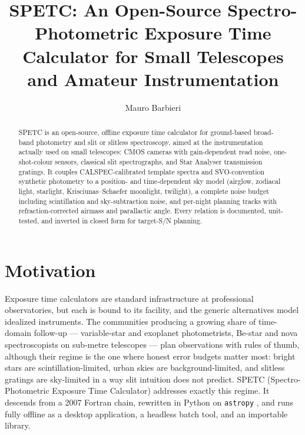 \documentclass[RNAAS]{aastex631}
\begin{document}
\title{SPETC: An Open-Source Spectro-Photometric Exposure Time Calculator
for Small Telescopes and Amateur Instrumentation}

\author[0000-0000-0000-0000]{Mauro Barbieri}


\begin{abstract}
SPETC is an open-source, offline exposure time calculator for ground-based
broad-band photometry and slit or slitless spectroscopy, aimed at the
instrumentation actually used on small telescopes: CMOS cameras with
gain-dependent read noise, one-shot-colour sensors, classical slit
spectrographs, and Star Analyser transmission gratings. It couples
CALSPEC-calibrated template spectra and SVO-convention synthetic photometry
to a position- and time-dependent sky model (airglow, zodiacal light,
starlight, Krisciunas--Schaefer moonlight, twilight), a complete noise
budget including scintillation and sky-subtraction noise, and per-night
planning tracks with refraction-corrected airmass and parallactic angle.
Every relation is documented, unit-tested, and inverted in closed form for
target-S/N planning.
\end{abstract}

\section{Motivation}

Exposure time calculators are standard infrastructure at professional
observatories, but each is bound to its facility, and the generic
alternatives model idealized instruments. The communities producing a
growing share of time-domain follow-up --- variable-star and exoplanet
photometrists, Be-star and nova spectroscopists on sub-metre telescopes ---
plan observations with rules of thumb, although their regime is the one
where honest error budgets matter most: bright stars are
scintillation-limited, urban skies are background-limited, and slitless
gratings are sky-limited in a way slit intuition does not predict. SPETC
(Spectro-Photometric Exposure Time Calculator) addresses exactly this
regime. It descends from a 2007 Fortran chain, rewritten in Python on
\texttt{astropy} \citep{astropy2022}, and runs fully offline as a desktop
application, a headless batch tool, and an importable library.
\end{document}
